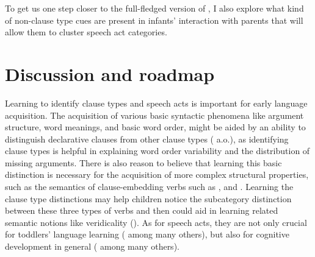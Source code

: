 
To get us one step closer to the full-fledged version of \hypos{}, I also explore what kind of non-clause type cues are present in infants' interaction with parents that will allow them to cluster speech act categories. 




\section{Discussion and roadmap}
\label{sec:intro:roadmap}

Learning to identify clause types and speech acts is important for early language acquisition. The acquisition of various basic syntactic phenomena like argument structure, word meanings, and basic word order, might be aided by an ability to distinguish declarative clauses from other clause types (\citealt{pinker1984, pinker1989, gleitman1990, frankgoldwaterfrank2013, perkins2019} a.o.), as identifying clause types is helpful in explaining word order variability and the distribution of missing arguments. There is also reason to believe that learning this basic distinction is necessary for the acquisition of more complex structural properties, such as the semantics of clause-embedding verbs such as ,  and . Learning the clause type distinctions may help children notice the subcategory distinction between these three types of verbs and then could aid in learning related semantic notions like veridicality (\citealt{white2015diss, lewis2017think,dudley2017,hacquardlidz2018}). As for speech acts, they are not only crucial for toddlers' language learning (\citealt{ninio1980, hoff1985cds,yoder1994,rowland2003cdswh, valian2003cds, rowe2017wh, gaudreau2021question} among many others), but also for cognitive development in general (\citealt{hohmann1995educating} among many others). 


